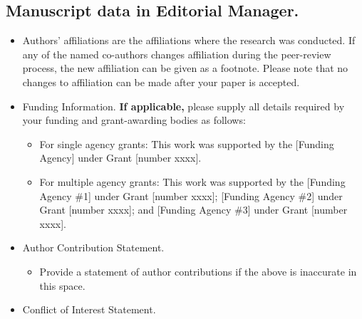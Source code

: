 \documentclass{article}
\theoremstyle{theorem}
\theoremstyle{definition}
\begin{document}
\subsection{Manuscript data in Editorial Manager.}
\begin{itemize}
\item Authors’ affiliations are the affiliations where the research was conducted. If any of the named co-authors changes affiliation during the peer-review process, the new affiliation can be given as a footnote. Please note that no changes to affiliation can be made after your paper is accepted. 

\item Funding Information.  {\bf If applicable,} please supply all details required by your funding and grant-awarding bodies as follows: %
\begin{itemize}
\item For single agency grants:
This work was supported by the [Funding Agency] under Grant [number xxxx].
\item For multiple agency grants:
This work was supported by the [Funding Agency \#1] under Grant [number xxxx]; [Funding Agency \#2] under Grant [number xxxx]; and [Funding Agency \#3] under Grant [number xxxx].
\end{itemize}
\item Author Contribution Statement.\\   %
\begin{itemize}
\item Provide a statement of author contributions if the above is inaccurate in this space.  %
\end{itemize}
\item Conflict of Interest Statement. \\  %
\end{itemize}
\end{document}
